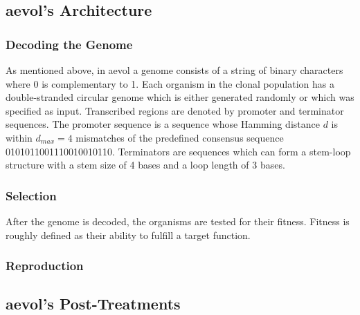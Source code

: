 \subsection{aevol's Architecture}

\subsubsection{Decoding the Genome}
As mentioned above, in aevol a genome consists of a string of binary characters where 0 is complementary to 1. Each organism in the clonal population has a double-stranded circular genome which is either generated randomly or which was specified as input. Transcribed regions are denoted by promoter and terminator sequences. The promoter sequence is a sequence whose Hamming distance $d$ is within $d_{max} = 4$ mismatches of the predefined consensus sequence 0101011001110010010110. Terminators are sequences which can form a stem-loop structure with a stem size of 4 bases and a loop length of 3 bases. 

\subsubsection{Selection}
After the genome is decoded, the organisms are tested for their fitness. Fitness is roughly defined as their ability to fulfill a target function. 
\subsubsection{Reproduction}

\subsection{aevol's Post-Treatments}\label{aevol_post-treatments}

